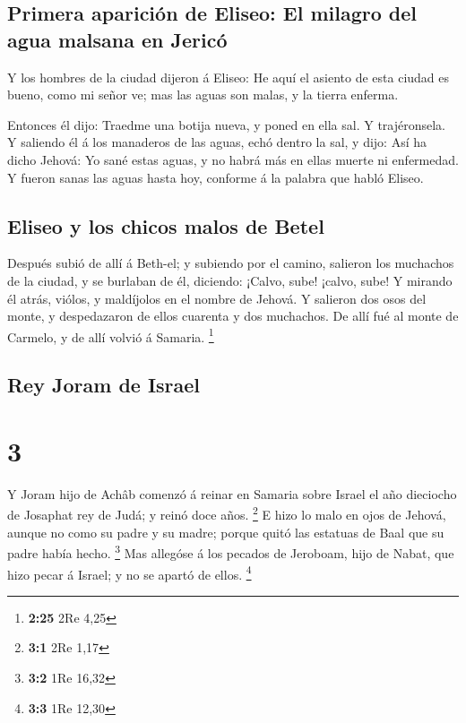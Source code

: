 \hypertarget{primera-apariciuxf3n-de-eliseo-el-milagro-del-agua-malsana-en-jericuxf3}{%
\subsection{Primera aparición de Eliseo: El milagro del agua malsana en
Jericó}\label{primera-apariciuxf3n-de-eliseo-el-milagro-del-agua-malsana-en-jericuxf3}}

 Y los hombres de la ciudad dijeron á Eliseo: He aquí el
asiento de esta ciudad es bueno, como mi señor ve; mas las aguas son
malas, y la tierra enferma.

 Entonces él dijo: Traedme una botija nueva, y poned en
ella sal. Y trajéronsela.  Y saliendo él á los manaderos
de las aguas, echó dentro la sal, y dijo: Así ha dicho Jehová: Yo sané
estas aguas, y no habrá más en ellas muerte ni enfermedad.
 Y fueron sanas las aguas hasta hoy, conforme á la
palabra que habló Eliseo.

\hypertarget{eliseo-y-los-chicos-malos-de-betel}{%
\subsection{Eliseo y los chicos malos de
Betel}\label{eliseo-y-los-chicos-malos-de-betel}}

 Después subió de allí á Beth-el; y subiendo por el
camino, salieron los muchachos de la ciudad, y se burlaban de él,
diciendo: ¡Calvo, sube! ¡calvo, sube!  Y mirando él
atrás, viólos, y maldíjolos en el nombre de Jehová. Y salieron dos osos
del monte, y despedazaron de ellos cuarenta y dos muchachos.
 De allí fué al monte de Carmelo, y de allí volvió á
Samaria. \footnote{\textbf{2:25} 2Re 4,25}

\hypertarget{rey-joram-de-israel}{%
\subsection{Rey Joram de Israel}\label{rey-joram-de-israel}}

\hypertarget{section-2}{%
\section{3}\label{section-2}}

 Y Joram hijo de Achâb comenzó á reinar en Samaria sobre
Israel el año dieciocho de Josaphat rey de Judá; y reinó doce años.
\footnote{\textbf{3:1} 2Re 1,17}  E hizo lo malo en ojos
de Jehová, aunque no como su padre y su madre; porque quitó las estatuas
de Baal que su padre había hecho. \footnote{\textbf{3:2} 1Re 16,32}
 Mas allegóse á los pecados de Jeroboam, hijo de Nabat,
que hizo pecar á Israel; y no se apartó de ellos. \footnote{\textbf{3:3}
  1Re 12,30}

